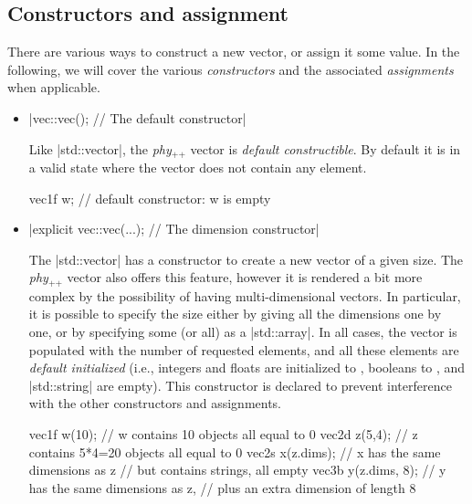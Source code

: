 \documentclass[12pt,a4paper]{report}
\newcommand{\phypp}{\textit{phy}$_{\text{++}}$\xspace}
\newcommand{\stdvec}{\cppinline|std::vector|\xspace}
\newenvironment{example}
{
    \begin{mdframed}[style=example,frametitle={Example}]
}
{
    \end{mdframed}
}
\newcommand{\cppfalse}{\cppinline{false}\xspace}
\begin{document}
\subsection{Constructors and assignment \label{SEC:core:vec:constructor}}

There are various ways to construct a new vector, or assign it some value. In the following, we will cover the various \emph{constructors} and the associated \emph{assignments} when applicable.

\begin{itemize}
\item \cppinline|vec::vec(); // The default constructor|

Like \stdvec, the \phypp vector is \emph{default constructible}. By default it is in a valid state where the vector does not contain any element.

\begin{example}
\begin{cppcode}
vec1f w; // default constructor: w is empty
\end{cppcode}
\end{example}

\item \cppinline|explicit vec::vec(...); // The dimension constructor|

The \stdvec has a constructor to create a new vector of a given size. The \phypp vector also offers this feature, however it is rendered a bit more complex by the possibility of having multi-dimensional vectors. In particular, it is possible to specify the size either by giving all the dimensions one by one, or by specifying some (or all) as a \cppinline|std::array|. In all cases, the vector is populated with the number of requested elements, and all these elements are \emph{default initialized} (i.e., integers and floats are initialized to , booleans to \cppfalse, and \cppinline|std::string| are empty). This constructor is declared  to prevent interference with the other constructors and assignments.

\begin{example}
\begin{cppcode}
vec1f w(10);     // w contains 10 objects all equal to 0
vec2d z(5,4);    // z contains 5*4=20 objects all equal to 0
vec2s x(z.dims); // x has the same dimensions as z
                 // but contains strings, all empty
vec3b y(z.dims, 8); // y has the same dimensions as z,
                    // plus an extra dimension of length 8
\end{cppcode}
\end{example}


\end{itemize}
\end{document}
